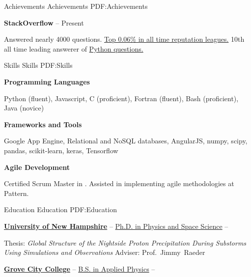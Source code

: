 \documentclass[letterpaper,MMMyyyy,nonstopmode]{simpleresumecv}
\begin{document}
\begin{Body}

\Section
{Achievements}
{Achievements}
{PDF:Achievements}

\Entry
\textbf{StackOverflow}
\hfill
{} -- Present
\begin{Detail}
\Item
Answered nearly 4000 questions.
\Item
\href{http://stackoverflow.com/cv/matthew-gilson-428809}{Top 0.06\% in all time reputation leagues.}
\Item
10th all time leading answerer of \href{http://stackoverflow.com/tags/python/topusers}{Python questions.}
\end{Detail}



\Section
{Skills}
{Skills}
{PDF:Skills}

\Entry
\textbf{Programming Languages}
\begin{Detail}
\Item Python (fluent), Javascript, C (proficient), Fortran (fluent), Bash (proficient), Java (novice)
\end{Detail}

\BigGap
\Entry
\textbf{Frameworks and Tools}
\begin{Detail}
\Item Google App Engine, Relational and NoSQL databases, AngularJS, numpy, scipy, pandas, scikit-learn, keras, Tensorflow
\end{Detail}

\BigGap
\Entry
\textbf{Agile Development}
\begin{Detail}
\Item Certified Scrum Master in .  Assisted in implementing agile methodologies at Pattern.
\end{Detail}



\Section
{Education}
{Education}
{PDF:Education}

\Entry
\href{http://www.unh.edu/}
{\textbf{University of New Hampshire}}
--
\href{http://physics.unh.edu/content/physics-phd}
{Ph.D. in Physics and Space Science}
\hfill
{} --

\Gap
\begin{Detail}
\BulletItem
Thesis: \textit{Global Structure of the Nightside Proton Precipitation During Substorms Using Simulations and Observations}
\BulletItem
Adviser:
Prof.~Jimmy~Raeder
\end{Detail}

\BigGap
\Entry
\href{http://www.gcc.edu/Pages/Grove-City-College.aspx}
{\textbf{Grove City College}}
--
\href{http://www.gcc.edu/academics/SEM/physics/Pages/default.aspx}
{B.S. in Applied Physics}
\hfill
{} -- 


\end{Body}
\end{document}
